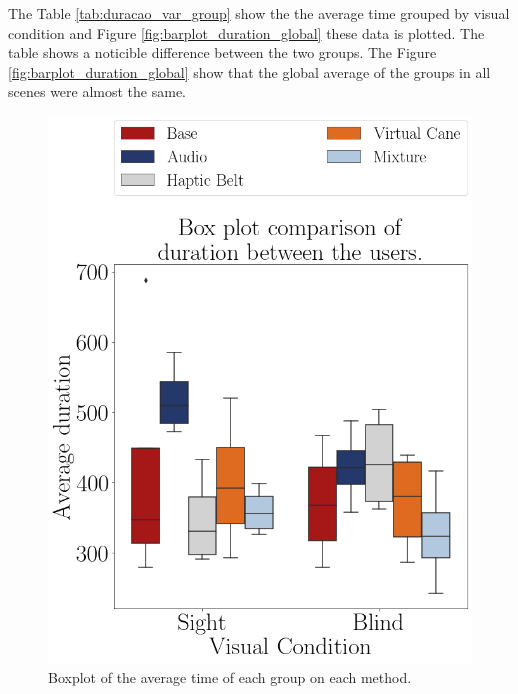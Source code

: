 

The Table \ref{tab:duracao_var_group} show the the average time grouped by visual condition and Figure \ref{fig:barplot_duration_global} these data is plotted. The table shows a noticible difference between the two groups. The Figure \ref{fig:barplot_duration_global} show that the global average of the groups in all scenes were almost the same.



\begin{figure}[!htb]
    \begin{minipage}{.45\linewidth}
        \centering
        \includegraphics[width = \linewidth]{Resultados/Tempo/Figuras/png/boxplot_duration_scene.png}
        \caption{Boxplot of the average time of each group on each method.}
        \label{fig:boxplot_duration_scene}

\end{minipage}
\end{figure}
